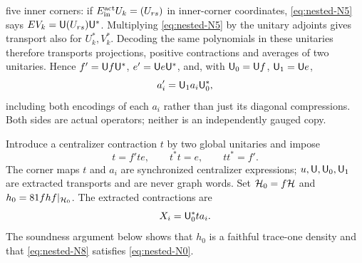 five inner corners: if $E^{\rm act}_{\rm in}U_k=(U_{rs})$ in inner-corner
coordinates, \eqref{eq:nested-N5} says $EV_k={\mathsf U}(U_{rs}){\mathsf U}^*$.
Multiplying \eqref{eq:nested-N5} by the unitary adjoints gives transport also for
$U_k^*,V_k^*$. Decoding the same polynomials in these unitaries
therefore transports projections, positive contractions and averages
of two unitaries. Hence $f'={\mathsf U}f{\mathsf U}^*$, $e'={\mathsf U}e{\mathsf U}^*$,
and, with ${\mathsf U}_0={\mathsf U}f$, ${\mathsf U}_1={\mathsf U}e$,
\begin{equation}
                  a_i'={\mathsf U}_1a_i{\mathsf U}_0^*,                          \label{eq:nested-N6}
\end{equation}
including both encodings of each $a_i$ rather than just its diagonal
compressions. Both sides are actual operators; neither is an
independently gauged copy.

Introduce a centralizer contraction $t$ by two global unitaries and impose
\begin{equation}
 t=f'te,\qquad t^*t=e,\qquad tt^*=f'.                         \label{eq:nested-N7}
\end{equation}
The corner maps $t$ and $a_i$ are synchronized centralizer expressions;
$u,{\mathsf U},{\mathsf U}_0,{\mathsf U}_1$ are extracted transports and are never graph words.
Set $\mathcal H_0=f\mathcal H$ and $h_0=81fhf|_{\mathcal H_0}$. The extracted contractions are
\begin{equation}
                         X_i={\mathsf U}_0^*ta_i.                      \label{eq:nested-N8}
\end{equation}
The soundness argument below shows that $h_0$ is a faithful trace-one density and that \eqref{eq:nested-N8} satisfies \eqref{eq:nested-N0}.

